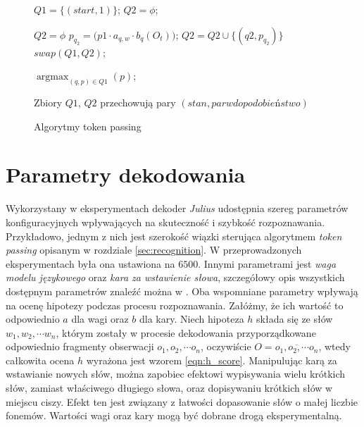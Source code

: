 \documentclass[11pt]{article}
\DeclareMathOperator*{\argmax}{\arg\max}   %
\begin{document}
		    \begin{figure}
		    	\begin{algorithmic}[1]
		    		
		    		
		    		\STATE $Q1 = \{(start, 1)\}$; 
		    		\STATE $Q2 = \phi$;		    
		    		
			    		\STATE $Q2 = \phi$
					    		\STATE $p_{q_2} = \bigg( p1\cdot a_{q,w}\cdot b_q(O_t) \label{line:b_q} \bigg)$;				    	
					    		\STATE $Q2 = Q2 \cup \{(q2, p_{q_2})\}$
				    		\ENDFOR
			    		\ENDFOR
			    		\STATE $swap(Q1, Q2)$;
		    		\ENDFOR
		    		
		    		\RETURN $\argmax_{(q,p)\in Q1}(p)$;
		    	\end{algorithmic}
	    	
		    	Zbiory $Q1$, $Q2$ przechowują pary $(stan, parwdopodobieństwo)$ 
		    	
		    	\caption{Algorytmy token passing}
		    	\label{alg:token_passing}
		    \end{figure}				   	
       

\section{Parametry dekodowania}
	\label{sec:meta_params}
	 	Wykorzystany w eksperymentach dekoder \textit{Julius} udostępnia szereg parametrów konfiguracyjnych wpływających na skuteczność i szybkość rozpoznawania. Przykładowo, jednym z nich jest szerokość wiązki sterująca algorytmem \textit{token passing} opisanym w rozdziale \ref{sec:recognition}. W przeprowadzonych eksperymentach była ona ustawiona na $6500$. Innymi parametrami jest \textit{waga modelu językowego} oraz \textit{kara za wstawienie słowa}, szczegółowy opis wszystkich dostępnym parametrów znaleźć można w \cite{juliusbook}. Oba wspomniane parametry wpływają na ocenę hipotezy podczas procesu rozpoznawania. Załóżmy, że ich wartość to odpowiednio $a$ dla wagi oraz $b$ dla kary. Niech hipoteza $h$ składa się ze słów $w_1, w_2, \cdots w_n$, którym zostały w procesie dekodowania przyporządkowane odpowiednio fragmenty obserwacji $o_1, o_2, \cdots o_n$, oczywiście $O=\overline{o_1,o_2,\cdots o_n}$, wtedy całkowita ocena $h$ wyrażona jest wzorem \ref{eqn:h_score}. Manipulując karą za wstawianie nowych słów, można zapobiec efektowi wypisywania wielu krótkich słów, zamiast właściwego długiego słowa, oraz dopisywaniu krótkich słów w miejscu ciszy. Efekt ten jest związany z łatwości dopasowanie słów o małej liczbie fonemów.  Wartości wagi oraz kary mogą być dobrane drogą eksperymentalną.
	
\end{document}
